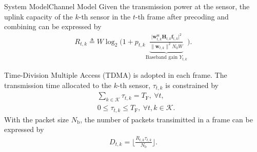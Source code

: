 \documentclass[aspectratio=169]{beamer}
\begin{document}
\begin{frame}{System Model}{Channel Model}
    \small
    Given the transmission power at the sensor, the uplink capacity of the $k$-th sensor in the $t$-th frame after precoding and combining can be expressed by
    \begin{align*}
        R_{t,k}
        \triangleq
        W\log_{2}\Bigg(1+p_{t,k}\underbrace{\frac{\big|\mathbf{w}_{t,k}^{\mathsf{H}}\mathbf{H}_{t,k}\mathbf{f}_{t,k}\big|^{2}}{\|\mathbf{w}_{t,k}\|^{2}N_{0}W}}_{\textrm{Baseband gain $Y_{t,k}$}}\Bigg).
    \end{align*}

    Time-Division Multiple Access (TDMA) is adopted in each frame.
    The transmission time allocated to the $k$-th sensor, $\tau_{t,k}$ is constrained by
    \begin{align*}
        &
        \textstyle{
        \sum_{k\in\mathcal{K}}\tau_{t,k}=T_{\mathrm{F}},\ \forall{t},
        }
        \\
        &
        0\leq\tau_{t,k}\leq T_{\mathrm{F}},\ \forall{t,k}\in\mathcal{K}.
    \end{align*}
    With the packet size $N_{\mathrm{b}}$, the number of packets transimitted in a frame can be expressed by 
    \begin{align*}
        D_{t,k}=\big\lfloor\frac{R_{t,k}\tau_{t,k}}{N_{\mathrm{b}}}\big\rfloor.
    \end{align*}
\end{frame}
\end{document}
